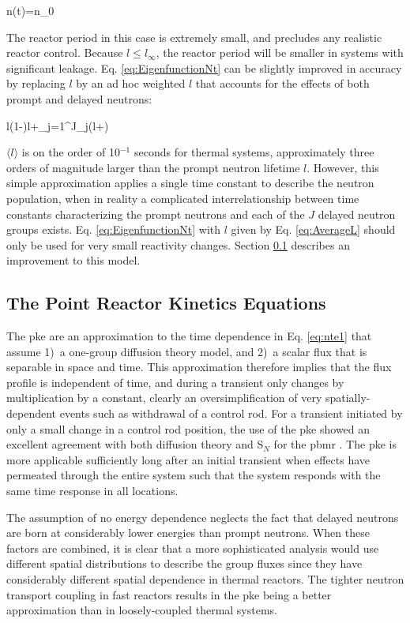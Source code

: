 \beq
\label{eq:EigenfunctionNt}
n(t)=n_0
\eeq

The reactor period in this case is extremely small, and precludes any realistic reactor control. Because \(l\leq l_\infty\), the reactor period will be smaller in systems with significant leakage. Eq. \eqref{eq:EigenfunctionNt} can be slightly improved in accuracy by replacing \(l\) by an ad hoc weighted \(l\) that accounts for the effects of both prompt and delayed neutrons:

\beq
\label{eq:AverageL}
\langle l\rangle\equiv(1-\beta)l+\sum_{j=1}^J\beta_j\left(l+\right)
\eeq

\(\langle l\rangle\) is on the order of 10$^{-1}$ seconds for thermal systems, approximately three orders of magnitude larger than the prompt neutron lifetime \(l\). However, this simple approximation applies a single time constant to describe the neutron population, when in reality a complicated interrelationship between time constants characterizing the prompt neutrons and each of the \(J\) delayed neutron groups exists. Eq. \eqref{eq:EigenfunctionNt} with \(l\) given by Eq. \eqref{eq:AverageL} should only be used for very small reactivity changes. Section \ref{sec:PKE} describes an improvement to this model.

\subsection{The Point Reactor Kinetics Equations}
\label{sec:PKE}

The \gls{pke} are an approximation to the time dependence in Eq. \eqref{eq:nte1} that assume 1)~a one-group diffusion theory model, and 2)~a scalar flux that is separable in space and time. This approximation therefore implies that the flux profile is independent of time, and during a transient only changes by multiplication by a constant, clearly an oversimplification of very spatially-dependent events such as withdrawal of a control rod. For a transient initiated by only a small change in a control rod position, the use of the \gls{pke} showed an excellent agreement with both diffusion theory and S$_N$ for the \gls{pbmr} \cite{tyobeka}. The \gls{pke} is more applicable sufficiently long after an initial transient when effects have permeated through the entire system such that the system responds with the same time response in all locations.

The assumption of no energy dependence neglects the fact that delayed neutrons are born at considerably lower energies than prompt neutrons. When these factors are combined, it is clear that a more sophisticated analysis would use different spatial distributions to describe the group fluxes since they have considerably different spatial dependence in thermal reactors. The tighter neutron transport coupling in fast reactors results in the \gls{pke} being a better approximation than in loosely-coupled thermal systems. 

